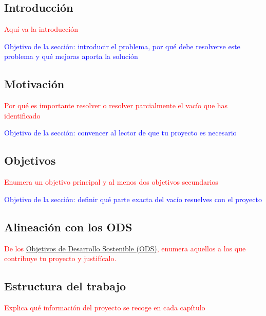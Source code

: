 \documentclass[12pt]{extarticle}
\numberwithin{equation}{section}
\begin{document}
\begin{refsection}
\section{Introducci\'on}
\textcolor{red}{Aqu\'i va la introducci\'on}

\textcolor{blue}{Objetivo de la secci\'on: introducir el problema, por qu\'e debe resolverse este problema y qu\'e mejoras aporta la soluci\'on}



\subsection{Motivaci\'on}
\textcolor{red}{Por qu\'e es importante resolver o resolver parcialmente el vac\'io que has identificado}

\textcolor{blue}{Objetivo de la secci\'on: convencer al lector de que tu proyecto es necesario}

\subsection{Objetivos}
\textcolor{red}{Enumera un objetivo principal y al menos dos objetivos secundarios}

\textcolor{blue}{Objetivo de la secci\'on: definir qu\'e parte exacta del vac\'io resuelves con el proyecto}

\subsection{Alineaci\'on con los ODS}

\textcolor{red}{De los \href{https://sdgs.un.org/es/goals}{Objetivos de Desarrollo Sostenible (ODS)}, enumera aquellos a los que contribuye tu proyecto y justif\'icalo.}

\subsection{Estructura del trabajo}

\textcolor{red}{Explica qu\'e informaci\'on del proyecto se recoge en cada cap\'itulo}

\newpage


\end{refsection}
\end{document}
